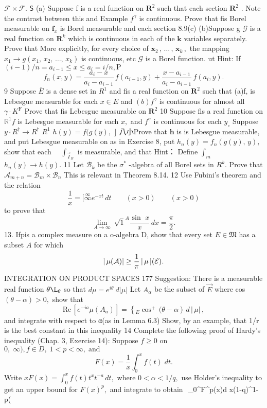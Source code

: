 ${\mathcal{F}}\times{\mathcal{F}}.$ $\boldsymbol{\mathsf{S}}$ (a) Suppose f is a real function on ${\boldsymbol{R}}^{2}$ such that each section ${\boldsymbol{R}}^{2}$ . Note the contrast between this and Example $f^{\gamma}$ is continuous. Prove that fis Borel measurable on ${\boldsymbol{f}}_{x}$ is Borel measurable and each section 8.9(c) (b)Suppose g $\scriptstyle{\mathcal{G}}$ is a real function on ${\boldsymbol{R}}^{k}$ which is continuous in each of the $\displaystyle{\boldsymbol{k}}$ variables separately. Prove that More explicitly, for every choice of ${\boldsymbol{x}}_{2}\,,\,\dots\,,\,{\boldsymbol{x}}_{k}\,,$ the mapping $x_{1}\to g(x_{1},\,x_{2},\,\ldots,\,x_{k})$ is continuous, etc $\scriptstyle{\mathcal{G}}$ is a Borel function. ut Hint: If $(i-1)/n=a_{i-1}\leq x\leq a_{i}=i/n,{\mathrm{P}}$ $$ f_{n}(x,y)=\frac{a_{i}-x}{a_{i}-a_{i-1}}\,f(a_{i-1},y)+\frac{x-a_{i-1}}{a_{i}-a_{i-1}}\,f(a_{i},y). $$ 9 Suppose $\bar{E}$ is a dense set in $R^{1}$ and fis a real function on ${\boldsymbol{R}}^{2}$ such that (a)f, is Lebesgue measurable for each $x\in E$ and $(b)f^{\gamma}$ is continuous for almost all $\scriptstyle{\gamma\cdot K^{\mathrm{F}}}$ Prove that fis Lebesgue measurable on ${\boldsymbol{R}}^{2}$ 10 Suppose fis a real function on $\scriptstyle{\mathbb{R}^{1}f}$ is Lebesgue measurable for each $x,$ and $f^{\gamma}$ is continuous for each $y_{\circ}$ Suppose $\scriptstyle y\cdot R^{\dagger}\to R^{\dagger}$ $R^{1}$ $h(y)=f(g(y),\;\rfloor$ 八小Prove that ${\boldsymbol{h}}$ is is Lebesgue measurable, and put Lebesgue measurable on as in Exercise 8, put $h_{n}(y)=f_{n}(g(y),\,y),$ show that each ${}\quad\int_{\overrightarrow{I}}_{\scriptscriptstyle B}$ is measurable, and that Hint： Define $\textstyle\int_{m}$ $h_{n}(y)\to h(y).$ 11 Let ${\mathcal{B}}_{k}$ be the ${\sigma}^{*}$ -algebra of all Borel sets in $R^{k}.$ Prove that $\mathcal{A}_{m+n}=\mathcal{B}_{m}\times\mathcal{B}_{n}$ This is relevant in Theorem 8.14. 12 Use Fubini's theorem and the relation $$ \frac{1}{x}= [\stackrel{\infty}{\infty}e^{-x t}\,d t\qquad(x>0)\qquad(x>0) $$ to prove that $$ \operatorname*{lim}_{A\to\infty}\ {\sqrt{1}}^{A}{\frac{\sin\,\,x}{x}}\,d x={\frac{\pi}{2}}. $$ 13. Ifpis a complex measure on a o-algebra D, show that every set $E\in{\mathfrak{M}}$ has a subset ${\mathbf{}}A$ for which $$ |\,\mu({\cal A})|\geq\frac{1}{\pi}\,|\,\mu\,|({\cal E}). $$INTEGRATION ON PRODUCT SPACES 177 Suggestion: There is a measurable real function $\theta\L_{\theta}$ so that $d\mu=e^{i\theta}~d|\mu|$ Let $A_{\alpha}$ be the subset of $\scriptstyle{\vec{E}}$ where cos $(\theta-\alpha)>0,$ show that $$ \mathrm{Re}\,\left[e^{-i a}\mu(A_{a})\right]=\left\{_{E}^{}{\cos}^{+}\, (\theta-\alpha\right)\,d\,\vert\,\mu\vert\,, $$ and integrate with respect to α(as in Lemma 6.3) Show, by an example, that 1/r is the best constant in this inequality 14 Complete the following proof of Hardy's inequality (Chap. 3, Exercise 14): Suppose $f\geq0$ on $0,\;\infty),f\in D,\;1<p<\infty,\;\mathrm{and}$ $$ F(x)={\frac{1}{x}}\int_{0}^{x}f(t)\;d t. $$ Write $x F(x)=\int_{0}^{x}f(t)t^{x}t^{-a}\,d t,$ where $0<\alpha<1/q,$ use Holder's inequality to get an upper bound for $F(x)^{p},$ and integrate to obtain $$ \bigcap_{0}^{\infty}F^{p}(x)\;d x\leq(1-\alpha q)^{1-p}(\alpha 